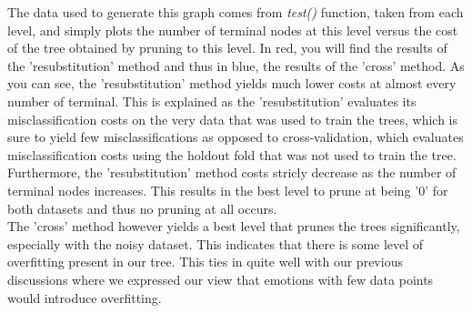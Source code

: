 \newpage

The data used to generate this graph comes from \emph{test()} function,
taken from each level, and simply plots the number of terminal nodes at this level versus
the cost of the tree obtained by pruning to this level.
In red, you will find the results of the 'resubstitution' method and thus in blue, the results of the 'cross' method.
As you can see, the 'resubstitution' method yields much lower costs at almost every number of terminal.
This is explained as the 'resubstitution' evaluates its misclassification costs on the very data that was used to train
the trees, which is sure to yield few misclassifications as opposed to cross-validation, which evaluates misclassification costs
using the holdout fold that was not used to train the tree.
Furthermore, the 'resubstitution' method costs stricly decrease as the number of terminal nodes increases.
This results in the best level to prune at being '0' for both datasets and thus no pruning at all occurs.\\
The 'cross' method however yields a best level that prunes the trees significantly, especially with the noisy dataset.
This indicates that there is some level of overfitting present in our tree. This ties in quite well with our previous discussions
where we expressed our view that emotions with few data points would introduce overfitting.
